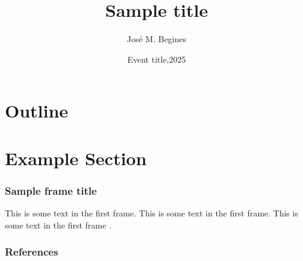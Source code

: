 \documentclass{beamer}
\title[]{Sample title}
\author[JM]{José M. Begines}
\institute[UNIOVI]
{
	\inst{1}
	Department of Physics \\
	University of Oviedo
}
\date[Event]{Event title,2025}
\begin{document}
	\begin{frame}
		\titlepage
	\end{frame}

	\section*{Outline}
		\begin{frame}
			\tableofcontents
		\end{frame}

	\section{Example Section}	
		\begin{frame}
			\frametitle{Sample frame title}
			This is some text in the first frame. This is some text in the first frame. This is some text in the first frame \cite{Begines:2026mlv}.
		\end{frame}

\appendix
	\begin{frame}
		\frametitle{References}
		
	\end{frame}
\end{document}
